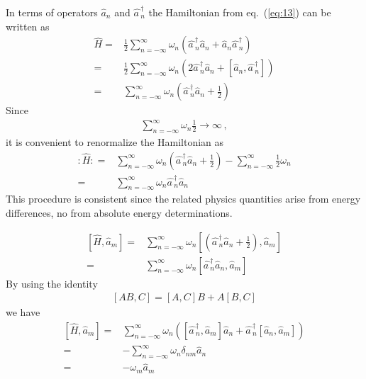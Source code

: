\begin{frame}
In terms of operators $\widehat{a}_{n}$ and $\widehat{a\,}_{n}^\dagger$ the Hamiltonian from eq.~(\ref{eq:13}) can be written as
\begin{align}
\label{eq:129}
\widehat{H}=&\frac{1}{2}\sum_{n=-\infty}^{\infty} \omega_n (\widehat{a\,}_{n}^\dagger\widehat{a}_{n} +\widehat{a}_{n} \widehat{a\,}_{n}^\dagger)
\nonumber\\
=&\frac{1}{2}\sum_{n=-\infty}^{\infty} \omega_n \left(2\widehat{a\,}_{n}^\dagger\widehat{a}_{n} 
+\left[\widehat{a}_{n}, \widehat{a\,}_{n}^\dagger\right]\right)
\nonumber\\
=&\sum_{n=-\infty}^{\infty} \omega_n \left(\widehat{a\,}_{n}^\dagger\widehat{a}_{n} +\frac{1}{2}\right)
\end{align}
Since
\begin{align}
  \sum_{n=-\infty}^{\infty}\omega_n \frac{1}{2}\to\infty\,,
\end{align}
it is convenient to renormalize the Hamiltonian as
\begin{align}
\label{eq:130}
  \colon\!\widehat{H}\colon=&\sum_{n=-\infty}^{\infty} \omega_n \left(\widehat{a\,}_{n}^\dagger\widehat{a}_{n} +\frac{1}{2}\right)-
  \sum_{n=-\infty}^{\infty} \frac{1}{2} \omega_n\nonumber\\
=&\sum_{n=-\infty}^{\infty} \omega_n \widehat{a\,}_{n}^\dagger\widehat{a}_{n}
\end{align}
This procedure is consistent since the related physics quantities arise from energy differences, no from absolute energy determinations.

  
\begin{align}
  \left[\widehat{H},\widehat{a}_{m}\right]=&
  \sum_{n=-\infty}^{\infty} \omega_n
  \left[\left(\widehat{a\,}_{n}^\dagger\widehat{a}_{n} +\frac{1}{2}\right),\widehat{a}_{m}\right]\nonumber\\
  =&\sum_{n=-\infty}^{\infty} \omega_n\left[\widehat{a\,}_{n}^\dagger\widehat{a}_{n},\widehat{a}_{m}\right]
\end{align}
By using the identity
\begin{align}
  \left[A B,C\right]=\left[A,C\right]B+A\left[B,C\right]
\end{align}
we have
\begin{align}
\label{eq:19}
   \left[\widehat{H},\widehat{a}_{m}\right]=&
\sum_{n=-\infty}^{\infty} \omega_n\left(
\left[\widehat{a\,}_{n}^\dagger,\widehat{a}_{m}\right]\widehat{a}_{n}
+\widehat{a\,}_{n}^\dagger\left[\widehat{a}_{n},\widehat{a}_{m}\right]
\right)\nonumber\\
=&-\sum_{n=-\infty}^{\infty} \omega_n
\delta_{n m}\widehat{a}_{n}
\nonumber\\
=&- \omega_m\widehat{a}_{m}
\end{align}


\end{frame}
